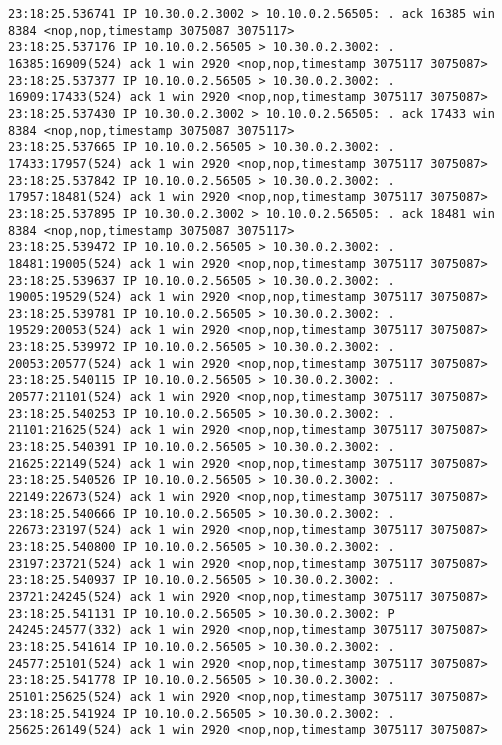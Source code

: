 \documentclass[a4paper,12pt]{article}
\begin{document}
\begin{Verbatim}
23:18:25.536741 IP 10.30.0.2.3002 > 10.10.0.2.56505: . ack 16385 win 8384 <nop,nop,timestamp 3075087 3075117>
23:18:25.537176 IP 10.10.0.2.56505 > 10.30.0.2.3002: . 16385:16909(524) ack 1 win 2920 <nop,nop,timestamp 3075117 3075087>
23:18:25.537377 IP 10.10.0.2.56505 > 10.30.0.2.3002: . 16909:17433(524) ack 1 win 2920 <nop,nop,timestamp 3075117 3075087>
23:18:25.537430 IP 10.30.0.2.3002 > 10.10.0.2.56505: . ack 17433 win 8384 <nop,nop,timestamp 3075087 3075117>
23:18:25.537665 IP 10.10.0.2.56505 > 10.30.0.2.3002: . 17433:17957(524) ack 1 win 2920 <nop,nop,timestamp 3075117 3075087>
23:18:25.537842 IP 10.10.0.2.56505 > 10.30.0.2.3002: . 17957:18481(524) ack 1 win 2920 <nop,nop,timestamp 3075117 3075087>
23:18:25.537895 IP 10.30.0.2.3002 > 10.10.0.2.56505: . ack 18481 win 8384 <nop,nop,timestamp 3075087 3075117>
23:18:25.539472 IP 10.10.0.2.56505 > 10.30.0.2.3002: . 18481:19005(524) ack 1 win 2920 <nop,nop,timestamp 3075117 3075087>
23:18:25.539637 IP 10.10.0.2.56505 > 10.30.0.2.3002: . 19005:19529(524) ack 1 win 2920 <nop,nop,timestamp 3075117 3075087>
23:18:25.539781 IP 10.10.0.2.56505 > 10.30.0.2.3002: . 19529:20053(524) ack 1 win 2920 <nop,nop,timestamp 3075117 3075087>
23:18:25.539972 IP 10.10.0.2.56505 > 10.30.0.2.3002: . 20053:20577(524) ack 1 win 2920 <nop,nop,timestamp 3075117 3075087>
23:18:25.540115 IP 10.10.0.2.56505 > 10.30.0.2.3002: . 20577:21101(524) ack 1 win 2920 <nop,nop,timestamp 3075117 3075087>
23:18:25.540253 IP 10.10.0.2.56505 > 10.30.0.2.3002: . 21101:21625(524) ack 1 win 2920 <nop,nop,timestamp 3075117 3075087>
23:18:25.540391 IP 10.10.0.2.56505 > 10.30.0.2.3002: . 21625:22149(524) ack 1 win 2920 <nop,nop,timestamp 3075117 3075087>
23:18:25.540526 IP 10.10.0.2.56505 > 10.30.0.2.3002: . 22149:22673(524) ack 1 win 2920 <nop,nop,timestamp 3075117 3075087>
23:18:25.540666 IP 10.10.0.2.56505 > 10.30.0.2.3002: . 22673:23197(524) ack 1 win 2920 <nop,nop,timestamp 3075117 3075087>
23:18:25.540800 IP 10.10.0.2.56505 > 10.30.0.2.3002: . 23197:23721(524) ack 1 win 2920 <nop,nop,timestamp 3075117 3075087>
23:18:25.540937 IP 10.10.0.2.56505 > 10.30.0.2.3002: . 23721:24245(524) ack 1 win 2920 <nop,nop,timestamp 3075117 3075087>
23:18:25.541131 IP 10.10.0.2.56505 > 10.30.0.2.3002: P 24245:24577(332) ack 1 win 2920 <nop,nop,timestamp 3075117 3075087>
23:18:25.541614 IP 10.10.0.2.56505 > 10.30.0.2.3002: . 24577:25101(524) ack 1 win 2920 <nop,nop,timestamp 3075117 3075087>
23:18:25.541778 IP 10.10.0.2.56505 > 10.30.0.2.3002: . 25101:25625(524) ack 1 win 2920 <nop,nop,timestamp 3075117 3075087>
23:18:25.541924 IP 10.10.0.2.56505 > 10.30.0.2.3002: . 25625:26149(524) ack 1 win 2920 <nop,nop,timestamp 3075117 3075087>

\end{Verbatim}
\end{document}

